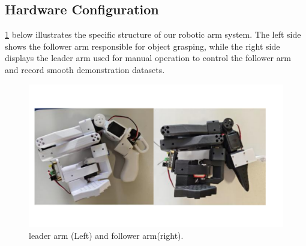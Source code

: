 \documentclass[runningheads]{llncs}
\begin{document}
\subsection{Hardware Configuration}
\cref{fig2-1} below illustrates the specific structure of our robotic arm system. The left side shows the follower arm responsible for object grasping, while the right side displays the leader arm used for manual operation to control the follower arm and record smooth demonstration datasets.


\begin{figure}
\centering
\includegraphics[width=\textwidth]{fig3.pdf}
\caption{leader arm (Left) and follower arm(right).} \label{fig2-1}
\end{figure}

\end{document}

